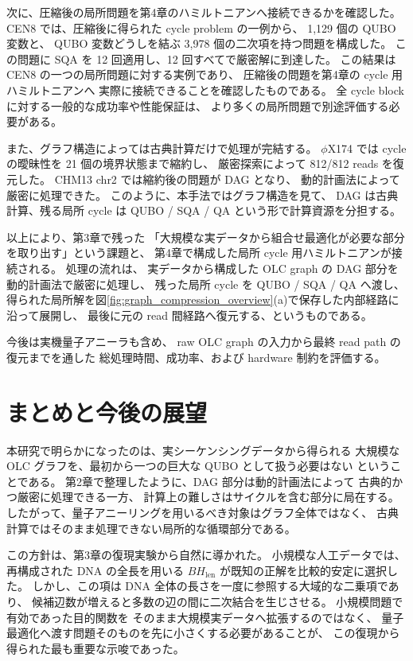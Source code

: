 \documentclass[a4j,10pt]{ujarticle}
\begin{document}
次に、圧縮後の局所問題を第4章のハミルトニアンへ接続できるかを確認した。
CEN8 では、圧縮後に得られた cycle problem の一例から、
1,129 個の QUBO 変数と、
QUBO 変数どうしを結ぶ 3,978 個の二次項を持つ問題を構成した。
この問題に SQA を 12 回適用し、12 回すべてで厳密解に到達した。
この結果は CEN8 の一つの局所問題に対する実例であり、
圧縮後の問題を第4章の cycle 用ハミルトニアンへ
実際に接続できることを確認したものである。
全 cycle block に対する一般的な成功率や性能保証は、
より多くの局所問題で別途評価する必要がある。

また、グラフ構造によっては古典計算だけで処理が完結する。
$\phi$X174 では cycle の曖昧性を 21 個の境界状態まで縮約し、
厳密探索によって 812/812 reads を復元した。
CHM13 chr2 では縮約後の問題が DAG となり、
動的計画法によって厳密に処理できた。
このように、本手法ではグラフ構造を見て、
DAG は古典計算、残る局所 cycle は QUBO / SQA / QA
という形で計算資源を分担する。

以上により、第3章で残った
「大規模な実データから組合せ最適化が必要な部分を取り出す」という課題と、
第4章で構成した局所 cycle 用ハミルトニアンが接続される。
処理の流れは、
実データから構成した OLC graph の DAG 部分を動的計画法で厳密に処理し、
残った局所 cycle を QUBO / SQA / QA へ渡し、
得られた局所解を図\ref{fig:graph_compression_overview}(a)で保存した内部経路に沿って展開し、
最後に元の read 間経路へ復元する、というものである。

今後は実機量子アニーラも含め、
raw OLC graph の入力から最終 read path の復元までを通した
総処理時間、成功率、および hardware 制約を評価する。



\section{まとめと今後の展望}

本研究で明らかになったのは、実シーケンシングデータから得られる
大規模な OLC グラフを、最初から一つの巨大な QUBO として扱う必要はない
ということである。
第2章で整理したように、DAG 部分は動的計画法によって
古典的かつ厳密に処理できる一方、
計算上の難しさはサイクルを含む部分に局在する。
したがって、量子アニーリングを用いるべき対象はグラフ全体ではなく、
古典計算ではそのまま処理できない局所的な循環部分である。

この方針は、第3章の復現実験から自然に導かれた。
小規模な人工データでは、再構成された DNA の全長を用いる
$B H_{\mathrm{len}}$ が既知の正解を比較的安定に選択した。
しかし、この項は DNA 全体の長さを一度に参照する大域的な二乗項であり、
候補辺数が増えると多数の辺の間に二次結合を生じさせる。
小規模問題で有効であった目的関数を
そのまま大規模実データへ拡張するのではなく、
量子最適化へ渡す問題そのものを先に小さくする必要があることが、
この復現から得られた最も重要な示唆であった。
\end{document}
